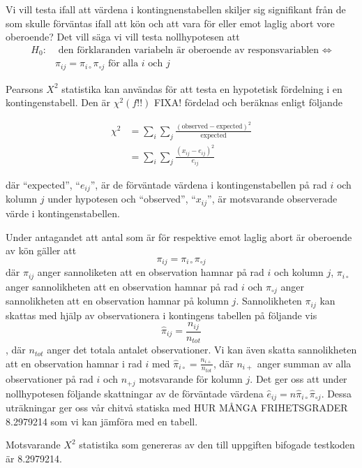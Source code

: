 \documentclass[]{article}
\begin{document}
Vi vill testa ifall att värdena i kontingnenstabellen skiljer sig
signifikant från de som skulle förväntas ifall att kön och att vara för
eller emot laglig abort vore oberoende? Det vill säga vi vill testa
nollhypotesen att \[
\begin{aligned}
H_{0}: & \text{ den förklaranden variabeln är oberoende av responsvariablen } \Leftrightarrow \\
       &\pi_{ij} = \pi_{i\circ}\pi_{\circ j} \text{ för alla $i$ och $j$}
\end{aligned}
\]

Pearsons \(X^{2}\) statistika kan användas för att testa en hypotetisk
fördelning i en kontingenstabell. Den är \(\chi^{2}(f!!)\) FIXA!
fördelad och beräknas enligt följande

\[
\begin{aligned}
\chi^{2} &= \sum_{i} \sum_{j}  \frac{(\text{observed} - \text{expected})^{2}}{\text{expected}}\\
         &= \sum_{i} \sum_{j}  \frac{(x_{ij} - e_{ij})^{2}}{e_{ij}}
\end{aligned}
\]

där ``expected'', ``\(e_{ij}\)'', är de förväntade värdena i
kontingenstabellen på rad \(i\) och kolumn \(j\) under hypotesen och
``observed'', ``\(x_{ij}\)'', är motsvarande observerade värde i
kontingenstabellen.

Under antagandet att antal som är för respektive emot laglig abort är
oberoende av kön gäller att \[
\pi_{ij} = \pi_{i\circ}\pi_{\circ j}
\] där \(\pi_{ij}\) anger sannoliketen att en observation hamnar på rad
\(i\) och kolumn \(j\), \(\pi_{i\circ}\) anger sannolikheten att en
observation hamnar på rad \(i\) och \(\pi_{\circ j}\) anger
sannolikheten att en observation hamnar på kolumn \(j\). Sannolikheten
\(\pi_{ij}\) kan skattas med hjälp av observationera i kontingens
tabellen på följande vis
\[\widehat{\pi}_{ij} = \frac{n_{ij}}{n_{tot}}\], där \(n_{tot}\) anger
det totala antalet observationer. Vi kan även skatta sannolikheten att
en observation hamnar i rad \(i\) med
\(\widehat{\pi}_{i\circ} = \frac{n_{i+}}{n_{tot}}\), där \(n_{i+}\)
anger summan av alla observationer på rad \(i\) och \(n_{+j}\)
motsvarande för kolumn \(j\). Det ger oss att under nollhypotesen
följande skattningar av de förväntade värdena
\(\widehat{e}_{ij} = n\widehat{\pi}_{i\circ}\widehat{\pi}_{\circ j}\).
Dessa uträkningar ger oss vår chitvå statiska med HUR MÅNGA
FRIHETSGRADER 8.2979214 som vi kan jämföra med en tabell.

Motsvarande \(X^{2}\) statistika som genereras av den till uppgiften
bifogade testkoden är 8.2979214.
\end{document}
